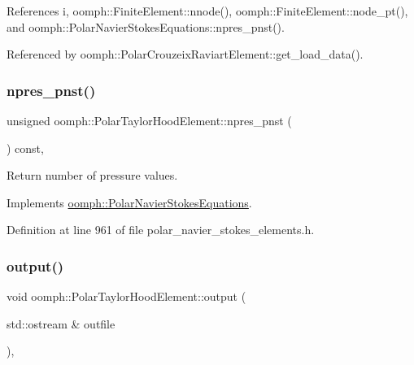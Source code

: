 References i, oomph\+::\+Finite\+Element\+::nnode(), oomph\+::\+Finite\+Element\+::node\+\_\+pt(), and oomph\+::\+Polar\+Navier\+Stokes\+Equations\+::npres\+\_\+pnst().



Referenced by oomph\+::\+Polar\+Crouzeix\+Raviart\+Element\+::get\+\_\+load\+\_\+data().

\mbox{\label{classoomph_1_1PolarTaylorHoodElement_a4ffb1ba7522ccb0d2fb181faa5bdf79b}} 
\subsubsection{\texorpdfstring{npres\+\_\+pnst()}{npres\_pnst()}}
{\footnotesize\ttfamily unsigned oomph\+::\+Polar\+Taylor\+Hood\+Element\+::npres\+\_\+pnst (\begin{DoxyParamCaption}{ }\end{DoxyParamCaption}) const\hspace{0.3cm}{\ttfamily [inline]}, {\ttfamily [virtual]}}



Return number of pressure values. 



Implements \hyperlink{classoomph_1_1PolarNavierStokesEquations_af66cafead00372b56b677ab40a184d1f}{oomph\+::\+Polar\+Navier\+Stokes\+Equations}.



Definition at line 961 of file polar\+\_\+navier\+\_\+stokes\+\_\+elements.\+h.

\mbox{\label{classoomph_1_1PolarTaylorHoodElement_ad6c70423cee82f9f2c7ff698f4f910ef}} 
\subsubsection{\texorpdfstring{output()}{output()}\hspace{0.1cm}{\footnotesize\ttfamily [1/4]}}
{\footnotesize\ttfamily void oomph\+::\+Polar\+Taylor\+Hood\+Element\+::output (\begin{DoxyParamCaption}\item[{std\+::ostream \&}]{outfile }\end{DoxyParamCaption})\hspace{0.3cm}{\ttfamily [inline]}, {\ttfamily [virtual]}}



